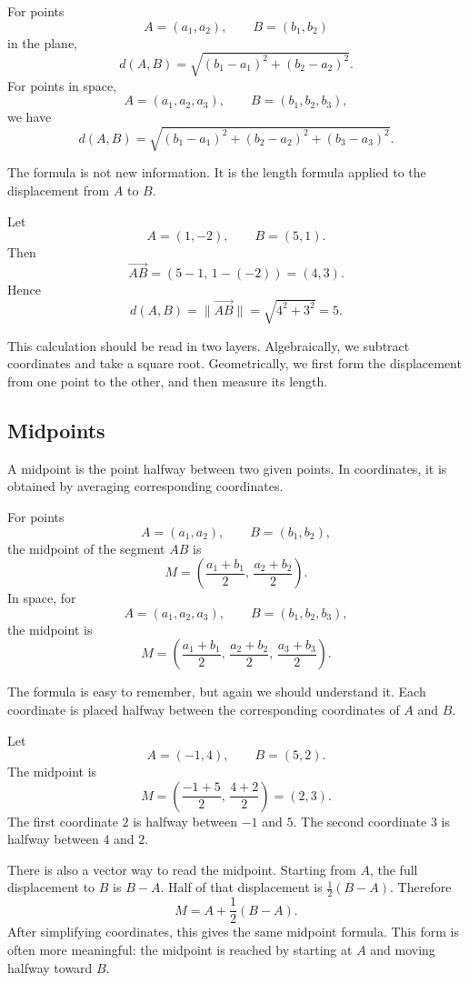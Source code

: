 \begin{definitionbox}
For points
\[
A=(a_1,a_2),
\qquad
B=(b_1,b_2)
\]
in the plane,
\[
d(A,B)=\sqrt{(b_1-a_1)^2+(b_2-a_2)^2}.
\]
For points in space,
\[
A=(a_1,a_2,a_3),
\qquad
B=(b_1,b_2,b_3),
\]
we have
\[
d(A,B)=\sqrt{(b_1-a_1)^2+(b_2-a_2)^2+(b_3-a_3)^2}.
\]
\end{definitionbox}

The formula is not new information. It is the length formula applied to the displacement from \(A\) to \(B\).

\begin{examplebox}
Let
\[
A=(1,-2),
\qquad
B=(5,1).
\]
Then
\[
\overrightarrow{AB}=(5-1,\,1-(-2))=(4,3).
\]
Hence
\[
d(A,B)=\lVert \overrightarrow{AB}\rVert=\sqrt{4^2+3^2}=5.
\]
\end{examplebox}

This calculation should be read in two layers. Algebraically, we subtract coordinates and take a square root. Geometrically, we first form the displacement from one point to the other, and then measure its length.

\subsection*{Midpoints}

A midpoint is the point halfway between two given points. In coordinates, it is obtained by averaging corresponding coordinates.

\begin{definitionbox}
For points
\[
A=(a_1,a_2),
\qquad
B=(b_1,b_2),
\]
the midpoint of the segment \(AB\) is
\[
M=\left(\frac{a_1+b_1}{2},\,\frac{a_2+b_2}{2}\right).
\]
In space, for
\[
A=(a_1,a_2,a_3),
\qquad
B=(b_1,b_2,b_3),
\]
the midpoint is
\[
M=\left(\frac{a_1+b_1}{2},\,\frac{a_2+b_2}{2},\,\frac{a_3+b_3}{2}\right).
\]
\end{definitionbox}

The formula is easy to remember, but again we should understand it. Each coordinate is placed halfway between the corresponding coordinates of \(A\) and \(B\).

\begin{examplebox}
Let
\[
A=(-1,4),
\qquad
B=(5,2).
\]
The midpoint is
\[
M=\left(\frac{-1+5}{2},\,\frac{4+2}{2}\right)=(2,3).
\]
The first coordinate \(2\) is halfway between \(-1\) and \(5\). The second coordinate \(3\) is halfway between \(4\) and \(2\).
\end{examplebox}

There is also a vector way to read the midpoint. Starting from \(A\), the full displacement to \(B\) is \(B-A\). Half of that displacement is \(\frac12(B-A)\). Therefore
\[
M=A+\frac12(B-A).
\]
After simplifying coordinates, this gives the same midpoint formula. This form is often more meaningful: the midpoint is reached by starting at \(A\) and moving halfway toward \(B\).

